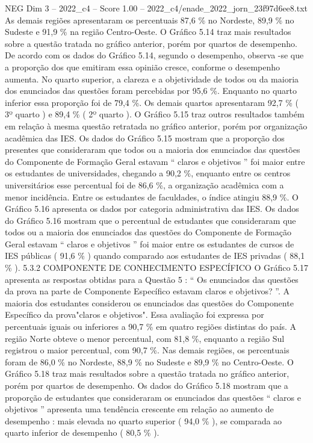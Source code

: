 \begin{textsample}{NEG Dim 3 – 2022\_c4 – Score 1.00 – 2022\_c4/enade\_2022\_jorn\_23f97d6ee8.txt}
As demais regiões apresentaram os percentuais 87,6 \% no Nordeste, 89,9 \% no Sudeste e 91,9 \% na região Centro-Oeste.
O Gráfico 5.14 traz mais resultados sobre a questão tratada no gráfico anterior, porém por quartos de desempenho.
De acordo com os dados do Gráfico 5.14, segundo o desempenho, observa -se que a proporção dos que emitiram essa opinião cresce, conforme o desempenho aumenta.
No quarto superior, a clareza e a objetividade de todos ou da maioria dos enunciados das questões foram percebidas por 95,6 \%.
Enquanto no quarto inferior essa proporção foi de 79,4 \%.
Os demais quartos apresentaram 92,7 \% ( 3º quarto ) e 89,4 \% ( 2º quarto ).
O Gráfico 5.15 traz outros resultados também em relação à mesma questão retratada no gráfico anterior, porém por organização acadêmica das IES.
Os dados do Gráfico 5.15 mostram que a proporção dos presentes que consideraram que todos ou a maioria dos enunciados das questões do Componente de Formação Geral estavam “ claros e objetivos ” foi maior entre os estudantes de universidades, chegando a 90,2 \%, enquanto entre os centros universitários esse percentual foi de 86,6 \%, a organização acadêmica com a menor incidência.
Entre os estudantes de faculdades, o índice atingiu 88,9 \%.
O Gráfico 5.16 apresenta os dados por categoria administrativa das IES.
Os dados do Gráfico 5.16 mostram que o percentual de estudantes que consideraram que todos ou a maioria dos enunciados das questões do Componente de Formação Geral estavam “ claros e objetivos ” foi maior entre os estudantes de cursos de IES públicas ( 91,6 \% ) quando comparado aos estudantes de IES privadas ( 88,1 \% ). 5.3.2 COMPONENTE DE CONHECIMENTO ESPECÍFICO O Gráfico 5.17 apresenta as respostas obtidas para a Questão 5 : “ Os enunciados das questões da prova na parte de Componente Específico estavam claros e objetivos? ”.
A maioria dos estudantes considerou os enunciados das questões do Componente Específico da prova"claros e objetivos".
Essa avaliação foi expressa por percentuais iguais ou inferiores a 90,7 \% em quatro regiões distintas do país.
A região Norte obteve o menor percentual, com 81,8 \%, enquanto a região Sul registrou o maior percentual, com 90,7 \%.
Nas demais regiões, os percentuais foram de 86,0 \% no Nordeste, 88,9 \% no Sudeste e 89,9 \% no Centro-Oeste.
O Gráfico 5.18 traz mais resultados sobre a questão tratada no gráfico anterior, porém por quartos de desempenho.
Os dados do Gráfico 5.18 mostram que a proporção de estudantes que consideraram os enunciados das questões “ claros e objetivos ” apresenta uma tendência crescente em relação ao aumento de desempenho : mais elevada no quarto superior ( 94,0 \% ), se comparada ao quarto inferior de desempenho ( 80,5 \% ).

\end{textsample}
